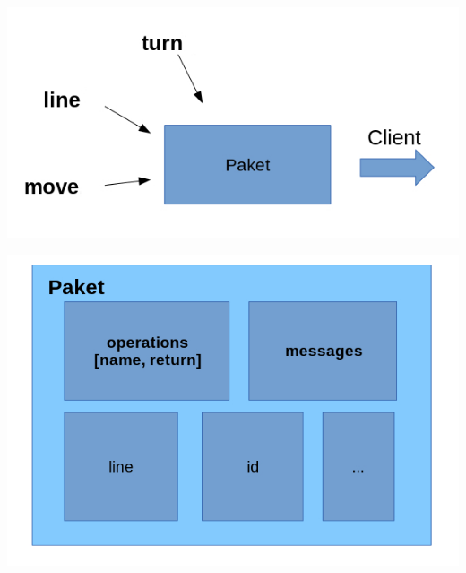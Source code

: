 \begin{frame}
	\begin{center}
		\includegraphics[scale=0.5]{simulation/Pakete.jpg}
	\end{center}
\end{frame}


\begin{frame}
	\begin{center}
		\includegraphics[scale=0.5]{simulation/Pakete2.jpg}
	\end{center}
\end{frame}